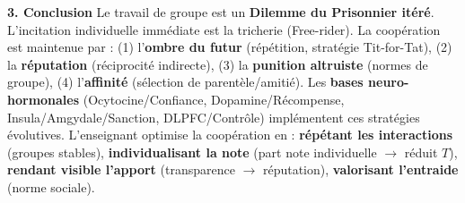 \documentclass[11pt]{article}
\begin{document}
\begin{exoresolu}
\textbf{3. Conclusion}
Le travail de groupe est un \textbf{Dilemme du Prisonnier itéré}. L'incitation individuelle immédiate est la tricherie (Free-rider). La coopération est maintenue par : (1) l'\textbf{ombre du futur} (répétition, stratégie Tit-for-Tat), (2) la \textbf{réputation} (réciprocité indirecte), (3) la \textbf{punition altruiste} (normes de groupe), (4) l'\textbf{affinité} (sélection de parentèle/amitié). Les \textbf{bases neuro-hormonales} (Ocytocine/Confiance, Dopamine/Récompense, Insula/Amgydale/Sanction, DLPFC/Contrôle) implémentent ces stratégies évolutives. L'enseignant optimise la coopération en : \textbf{répétant les interactions} (groupes stables), \textbf{individualisant la note} (part note individuelle $\to$ réduit $T$), \textbf{rendant visible l'apport} (transparence $\to$ réputation), \textbf{valorisant l'entraide} (norme sociale).
\end{exoresolu}
\end{document}
